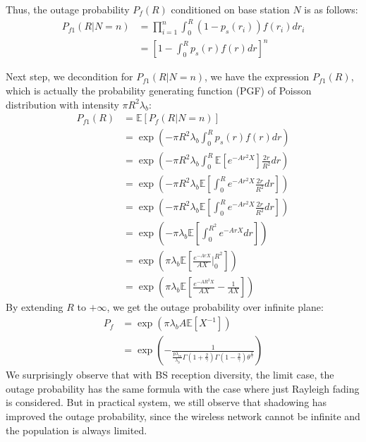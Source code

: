 Thus, the outage probability $P_f\left( R\right) $ conditioned on base station $N$ is as follows:
\begin{align}
	P_{f1}\left( R \vert N= n\right ) &=  \prod_{i=1}^{n}\int_{0}^{R}(1-p_{s}(r_i))f(r_i) dr_i \nonumber\\
	&= \left[ 1-\int_{0}^{R} p_s\left(r\right)f\left( r\right)dr \right]^n 
\end{align} 

Next step, we decondition for  $P_{f1}\left( R \vert N= n\right )$, we have the expression $P_{f1}\left( R \right )$, which is actually the probability generating function (PGF) of Poisson distribution with intensity $\pi R^2 \lambda_b$:
\begin{align}
		P_{f1}\left( R\right ) &= \mathbb{E}\left[ P_f\left( R \vert N= n\right )  \right] \nonumber\\
		&= \exp(-\pi R^2 \lambda_b \int_{0}^{R} p_{s}\left( r \right)f\left( r\right)dr  ) \\
		&= \exp(-\pi R^2 \lambda_b \int_{0}^{R} \mathbb{E}\left[ e^{-Ar^2X} \right]  \frac{2r}{R^2}dr) \\ 
		&= \exp(-\pi R^2 \lambda_b \mathbb{E}\left[\int_{0}^{R} e^{-Ar^2X} \frac{2r}{R^2}dr \right] ) \\ 
		&= \exp(-\pi R^2 \lambda_b \mathbb{E}\left[\int_{0}^{R} e^{-Ar^2X} \frac{2r}{R^2}dr \right] ) \\ 
		&= \exp(-\pi\lambda_b \mathbb{E}\left[\int_{0}^{R^2} e^{-ArX} dr \right] ) \\
		&= \exp( \pi\lambda_b \mathbb{E}\left[ \frac{e^{-ArX} }{AX} \vert_{0}^{R^2}\right] ) \\
		&= \exp( \pi\lambda_b \mathbb{E}\left[ \frac{e^{-AR^2X} }{AX} - \frac{1}{AX}\right] )
\end{align}
By extending $R$ to $+\infty$, we get the outage probability over infinite plane:
\begin{align}
	\label{eq:analytical_result_approach_1}
	P_f &=  \exp( \pi\lambda_b A \mathbb{E}\left[ {X^{-1}}\right] ) \\
	&= \exp(-\frac{1}{\frac{p\lambda_m}{\lambda_b}\Gamma(1+\frac{2}{\gamma}) \Gamma(1-\frac{2}{\gamma})\theta^{\frac{2}{\gamma}}} )
\end{align}
We surprisingly observe that with BS reception diversity, the limit case, the outage probability has the same formula with the case where just Rayleigh fading is considered. But in practical system, we still observe that shadowing has improved the outage probability, since the wireless network cannot be infinite and the population is always limited. 


